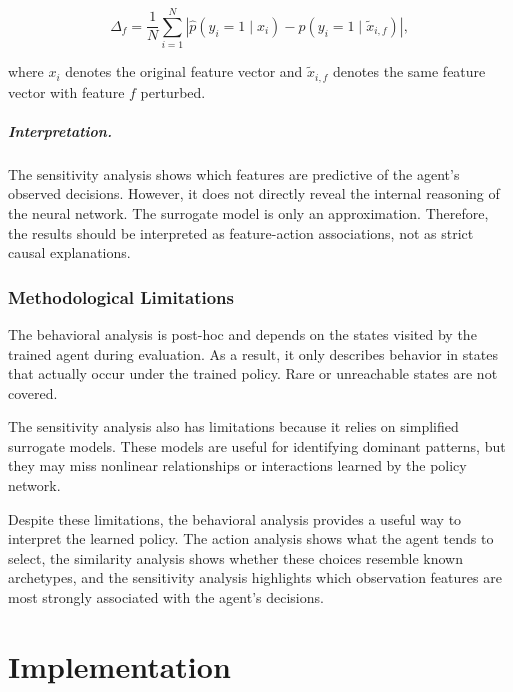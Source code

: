 \documentclass[english,bachelor]{hsluthesis}
\begin{document}
\begin{equation}
\Delta_f =
\frac{1}{N}
\sum_{i=1}^{N}
\left|
\hat{p}(y_i = 1 \mid x_i)
-
\hat{p}(y_i = 1 \mid \tilde{x}_{i,f})
\right|,
\end{equation}

where $x_i$ denotes the original feature vector and $\tilde{x}_{i,f}$ denotes the same feature vector with feature $f$ perturbed.

\paragraph{Interpretation.}
The sensitivity analysis shows which features are predictive of the agent's observed decisions. However, it does not directly reveal the internal reasoning of the neural network. The surrogate model is only an approximation. Therefore, the results should be interpreted as feature-action associations, not as strict causal explanations.

\subsection{Methodological Limitations}

The behavioral analysis is post-hoc and depends on the states visited by the trained agent during evaluation. As a result, it only describes behavior in states that actually occur under the trained policy. Rare or unreachable states are not covered.

The sensitivity analysis also has limitations because it relies on simplified surrogate models. These models are useful for identifying dominant patterns, but they may miss nonlinear relationships or interactions learned by the policy network.

Despite these limitations, the behavioral analysis provides a useful way to interpret the learned policy. The action analysis shows what the agent tends to select, the similarity analysis shows whether these choices resemble known archetypes, and the sensitivity analysis highlights which observation features are most strongly associated with the agent's decisions.

\chapter{Implementation}
\end{document}
